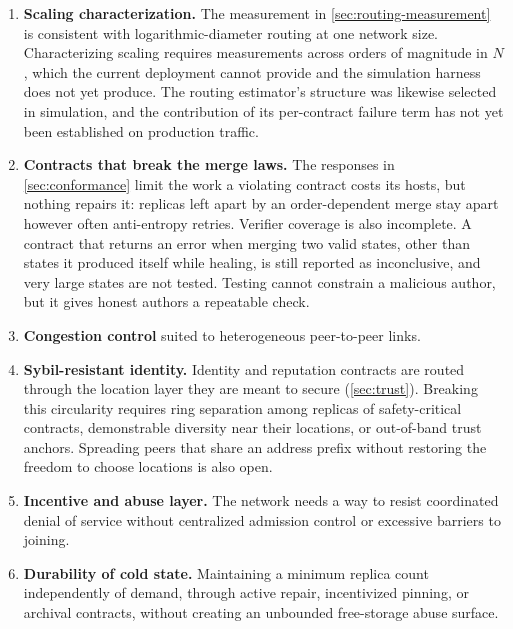 \begin{enumerate}[leftmargin=1.4em, itemsep=2pt]
  \item \textbf{Scaling characterization.} The measurement in \cref{sec:routing-measurement} is consistent with logarithmic-diameter routing at one network size. Characterizing scaling requires measurements across orders of magnitude in $N$, which the current deployment cannot provide and the simulation harness does not yet produce. The routing estimator's structure was likewise selected in simulation, and the contribution of its per-contract failure term has not yet been established on production traffic.
  \item \textbf{Contracts that break the merge laws.} The responses in \cref{sec:conformance} limit the work a violating contract costs its hosts, but nothing repairs it: replicas left apart by an order-dependent merge stay apart however often anti-entropy retries. Verifier coverage is also incomplete. A contract that returns an error when merging two valid states, other than states it produced itself while healing, is still reported as inconclusive, and very large states are not tested. Testing cannot constrain a malicious author, but it gives honest authors a repeatable check.
  \item \textbf{Congestion control} suited to heterogeneous peer-to-peer links.
  \item \textbf{Sybil-resistant identity.} Identity and reputation contracts are routed through the location layer they are meant to secure (\cref{sec:trust}). Breaking this circularity requires ring separation among replicas of safety-critical contracts, demonstrable diversity near their locations, or out-of-band trust anchors. Spreading peers that share an address prefix without restoring the freedom to choose locations is also open.
  \item \textbf{Incentive and abuse layer.} The network needs a way to resist coordinated denial of service without centralized admission control or excessive barriers to joining.
  \item \textbf{Durability of cold state.} Maintaining a minimum replica count independently of demand, through active repair, incentivized pinning, or archival contracts, without creating an unbounded free-storage abuse surface.
\end{enumerate}
